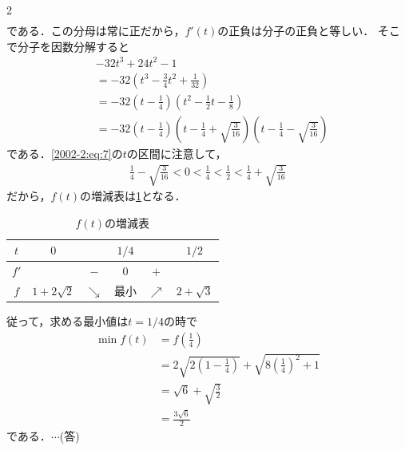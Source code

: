 \documentclass[../../main.tex]{subfiles}
\begin{document}
\begin{multicols}{2}
\begin{align*}
  \end{align*}
  である．この分母は常に正だから，$f'(t)$の正負は分子の正負と等しい．
  そこで分子を因数分解すると
  \begin{align*}
     & -32t^3 + 24t^2-1                                                                                                            \\
     & = -32\left(t^3-\frac{3}{4}t^2+\frac{1}{32}\right)                                                                           \\
     & = -32\left(t-\frac{1}{4}\right)\left(t^2-\frac{1}{2}t-\frac{1}{8}\right)                                                    \\
     & = -32\left(t-\frac{1}{4}\right)\left(t-\frac{1}{4}+\sqrt{\frac{3}{16}}\right)\left(t-\frac{1}{4}-\sqrt{\frac{3}{16}}\right)
  \end{align*}
  である．\cref{2002-2:eq:7}の$t$の区間に注意して，
  \begin{align*}
    \frac{1}{4}-\sqrt{\frac{3}{16}} < 0 < \frac{1}{4} < \frac{1}{2} < \frac{1}{4}+\sqrt{\frac{3}{16}}
  \end{align*}
  だから，$f(t)$の増減表は\cref{2002-2:table:1}となる．

  \begin{table}[H]
    \centering
    \caption{$f(t)$の増減表}
    \label{2002-2:table:1}
    \begin{tabular}{|c||c|c|c|c|c|}
      \hline
      $t$  & $0$           &            & $1/4$ &            & $1/2$        \\
      \hline
      $f'$ &               & $-$        & $0$   & $+$        &              \\
      \hline
      $f$  & $1+2\sqrt{2}$ & $\searrow$ & 最小    & $\nearrow$ & $2+\sqrt{3}$ \\
      \hline
    \end{tabular}
  \end{table}

  従って，求める最小値は$t=1/4$の時で
  \begin{align*}
    \min f(t)
     & = f\left(\frac{1}{4}\right)                                                  \\
     & = 2\sqrt{2\left(1-\frac{1}{4}\right)} + \sqrt{8\left(\frac{1}{4}\right)^2+1} \\
     & = \sqrt{6} + \sqrt{\frac{3}{2}}                                              \\
     & = \frac{3\sqrt{6}}{2}
  \end{align*}
  である．$\cdots$(答)



\end{multicols}
\end{document}
